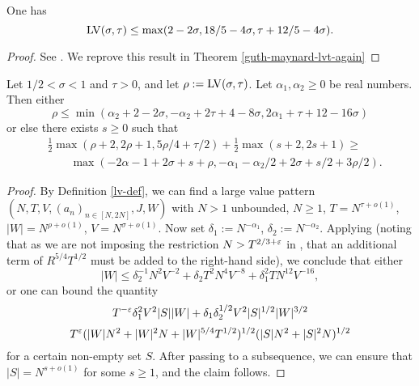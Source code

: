 \begin{theorem}\label{guth-maynard-lvt} One has
$$ \mathrm{LV}(\sigma,\tau) \leq \max(2-2\sigma, 18/5 - 4 \sigma, \tau + 12/5 - 4\sigma).$$
\end{theorem}

\literature
{}

\begin{proof}
See \cite[Theorem~1.1]{guth-maynard}. We reprove this result in Theorem \ref{guth-maynard-lvt-again}
\end{proof}

\begin{theorem}\label{bourgain-lvt} \cite{bourgain_large_2000} Let $1/2 < \sigma < 1$ and $\tau > 0$, and let $\rho := \mathrm{LV}(\sigma,\tau)$.  Let $\alpha_1, \alpha_2 \geq 0$ be real numbers.  Then either
$$ \rho \leq \min( \alpha_2 + 2 - 2 \sigma, -\alpha_2 + 2\tau+4-8\sigma, 2\alpha_1 + \tau + 12 - 16 \sigma)$$
or else there exists $s \geq 0$ such that
\begin{equation}\label{rs}
\begin{split}
     &\frac{1}{2}\max(\rho+2, 2\rho+1, 5\rho/4 + \tau/2) + \frac{1}{2}\max(s+2, 2s+1) \geq \\
		&\qquad\max( -2\alpha-1 + 2\sigma + s + \rho, -\alpha_1 - \alpha_2/2 + 2\sigma + s/2 + 3\rho/2).
\end{split}
\end{equation}
\end{theorem}

\begin{proof}  By Definition \ref{lv-def}, we can find a large value pattern $(N,T,V,(a_n)_{n \in [N,2N]},J,W)$ with $N>1$ unbounded, $N \geq 1$, $T = N^{\tau+o(1)}$, $|W| = N^{\rho+o(1)}$, $V = N^{\sigma+o(1)}$.  Now set $\delta_1 := N^{-\alpha_1}$, $\delta_2 := N^{-\alpha_2}$.  Applying \cite[(4.41), (4.42), (4.55), (4.57)]{bourgain_large_2000} (noting that as we are not imposing the restriction $N > T^{2/3+\varepsilon}$ in \cite[Lemma 3.7]{bourgain_large_2000}, that an additional term of $R^{5/4} T^{1/2}$ must be added to the right-hand side), we conclude that either
$$ |W| \leq \delta_2^{-1} N^2 V^{-2} + \delta_2 T^2 N^4 V^{-8} + \delta_1^2 T N^{12} V^{-16},$$
or one can bound the quantity
$$ T^{-\varepsilon} \delta_1^2 V^2 |S| |W| + \delta_1 \delta_2^{1/2} V^2 |S|^{1/2} |W|^{3/2}$$
$$ T^\varepsilon (|W|N^2 + |W|^2 N + |W|^{5/4} T^{1/2})^{1/2} (|S| N^2 + |S|^2 N)^{1/2}$$
for a certain non-empty set $S$.  After passing to a subsequence, we can ensure that $|S| = N^{s+o(1)}$ for some $s \geq 1$, and the claim follows.
\end{proof}

